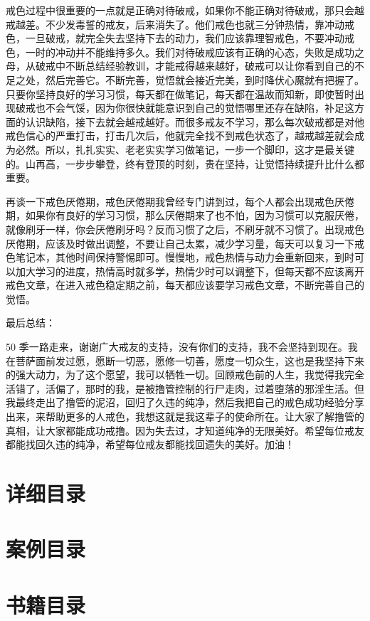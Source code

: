 \documentclass[fontset=founder]{ctexart}
\begin{document}
戒色过程中很重要的一点就是正确对待破戒，如果你不能正确对待破戒，那只会越戒越差。不少发毒誓的戒友，后来消失了。他们戒色也就三分钟热情，靠冲动戒色，一旦破戒，就完全失去坚持下去的动力，我们应该靠理智戒色，不要冲动戒色，一时的冲动并不能维持多久。我们对待破戒应该有正确的心态，失败是成功之母，从破戒中不断总结经验教训，才能戒得越来越好，破戒可以让你看到自己的不足之处，然后完善它。不断完善，觉悟就会接近完美，到时降伏心魔就有把握了。只要你坚持良好的学习习惯，每天都在做笔记，每天都在温故而知新，即使暂时出现破戒也不会气馁，因为你很快就能意识到自己的觉悟哪里还存在缺陷，补足这方面的认识缺陷，接下去就会越戒越好。而很多戒友不学习，那么每次破戒都是对他戒色信心的严重打击，打击几次后，他就完全找不到戒色状态了，越戒越差就会成为必然。所以，扎扎实实、老老实实学习做笔记，一步一个脚印，这才是最关键的。山再高，一步步攀登，终有登顶的时刻，贵在坚持，让觉悟持续提升比什么都重要。

再谈一下戒色厌倦期，戒色厌倦期我曾经专门讲到过，每个人都会出现戒色厌倦期，如果你有良好的学习习惯，那么厌倦期来了也不怕，因为习惯可以克服厌倦，就像刷牙一样，你会厌倦刷牙吗？反而习惯了之后，不刷牙就不习惯了。出现戒色厌倦期，应该及时做出调整，不要让自己太累，减少学习量，每天可以复习一下戒色笔记本，其他时间保持警惕即可。慢慢地，戒色热情与动力会重新回来，到时可以加大学习的进度，热情高时就多学，热情少时可以调整下，但每天都不应该离开戒色文章，在进入戒色稳定期之前，每天都应该要学习戒色文章，不断完善自己的觉悟。

最后总结：

50 季一路走来，谢谢广大戒友的支持，没有你们的支持，我不会坚持到现在。我在菩萨面前发过愿，愿断一切恶，愿修一切善，愿度一切众生，这也是我坚持下来的强大动力，为了这个愿望，我可以牺牲一切。回顾戒色前的人生，我觉得我完全活错了，活偏了，那时的我，是被撸管控制的行尸走肉，过着堕落的邪淫生活。但我最终走出了撸管的泥沼，回归了久违的纯净，然后我把自己的戒色成功经验分享出来，来帮助更多的人戒色，我想这就是我这辈子的使命所在。让大家了解撸管的真相，让大家都能成功戒撸。因为失去过，才知道纯净的无限美好。希望每位戒友都能找回久违的纯净，希望每位戒友都能找回遗失的美好。加油！

\appendix

\section{详细目录}

\setcounter{tocdepth}{5}
\renewcommand*{\contentsname}{}
\tableofcontents

\section{案例目录}

\renewcommand*{\listtheoremname}{}
\listoftheorems[ignoreall, show = case]

\section{书籍目录}

\renewcommand*{\listtheoremname}{}
\listoftheorems[ignoreall, show = book]
\end{document}

